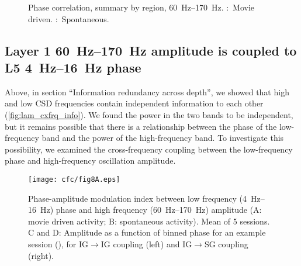 \begin{figure}[htbp]
    \centering
    \hspace*{\fill}
    \hspace*{\fill}\hspace{.2cm}\hspace*{\fill}
    \hspace*{\fill}
    \caption{Phase correlation, summary by region, \SIrange{60}{170}{Hz}.
\protect{}:~Movie driven.
\protect{}:~Spontaneous.
}
\label{fig:lam_phasestats_gamma_summary_csd}
\end{figure}


\FloatBarrier
\subsection{Layer 1 \SIrange{60}{170}{Hz} amplitude is coupled to L5 \SIrange{4}{16}{Hz} phase}

Above, in section ``Information redundancy across depth'', we showed that high and low \ac{CSD} frequencies contain independent information to each other (\autoref{fig:lam_cxfrq_info}).
We found the power in the two bands to be independent, but it remains possible that there is a relationship between the phase of the low-frequency band and the power of the high-frequency band.
To investigate this possibility, we examined the cross-frequency coupling between the low-frequency phase and high-frequency oscillation amplitude.

\begin{figure}[htbp]
\centering \texttt{[image: cfc/fig8A.eps]}
%
\caption{
Phase-amplitude modulation index between low frequency (\SIrange{4}{16}{Hz}) phase and high frequency (\SIrange{60}{170}{Hz}) amplitude (A: movie driven activity; B: spontaneous activity).
Mean of \num{5} sessions.
C and D: Amplitude as a function of binned phase for an example session (), for \ac{IG}$\rightarrow$\ac{IG} coupling (left) and \ac{IG}$\rightarrow$\ac{SG} coupling (right).}%
\label{fig:lam_8}
%
\end{figure}


